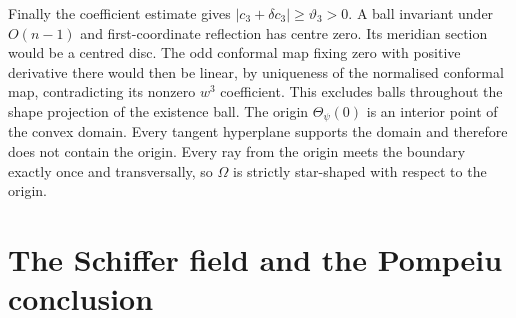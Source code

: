 Finally the coefficient estimate gives
$|c_3+\delta c_3|\ge\vartheta_3>0$.
A ball invariant under $O(n-1)$ and first-coordinate reflection has
centre zero. Its meridian section would be a centred disc.
The odd conformal map fixing zero with positive derivative there
would then be linear, by uniqueness of the normalised conformal map,
contradicting its nonzero $w^3$ coefficient.
This excludes balls throughout the shape projection of the existence
ball. The origin $\Theta_\psi(0)$ is an interior point of the convex
domain. Every tangent hyperplane supports the domain and therefore
does not contain the origin. Every ray from the origin meets the
boundary exactly once and transversally, so $\Omega$ is strictly
star-shaped with respect to the origin.

\section{The Schiffer field and the Pompeiu conclusion}
\label{gd:sec:conclusion}

